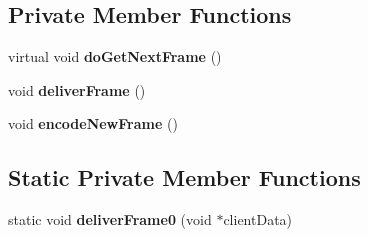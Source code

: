 \subsection*{Private Member Functions}
\begin{DoxyCompactItemize}
\item 
\mbox{\label{class_live_source_withx264_aaeed816f3cc3746bfcb467658d40344c}} 
virtual void {\bfseries do\+Get\+Next\+Frame} ()
\item 
\mbox{\label{class_live_source_withx264_a54bc6e2666e70ac524a4cad91d145ec0}} 
void {\bfseries deliver\+Frame} ()
\item 
\mbox{\label{class_live_source_withx264_aecadad21a18e2b0bbf63a2565ac7dea4}} 
void {\bfseries encode\+New\+Frame} ()
\end{DoxyCompactItemize}
\subsection*{Static Private Member Functions}
\begin{DoxyCompactItemize}
\item 
\mbox{\label{class_live_source_withx264_a0ffee0c3bc9560149989c24680484239}} 
static void {\bfseries deliver\+Frame0} (void $\ast$client\+Data)
\end{DoxyCompactItemize}
